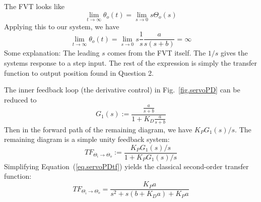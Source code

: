 \begin{Solution}{3}
        The FVT looks like
        \begin{equation}
            \lim_{t\to\infty} \theta_o(t) = \lim_{s\to0}s\Theta_o(s)
        \end{equation}
        Applying this to our system, we have
        \begin{equation}
            \lim_{t\to\infty} \theta_o(t)
            =
            \lim_{s\to0} s \frac{1}{s} \frac{a}{s(s+b)} = \infty
        \end{equation}
        Some explanation:  The leading $s$ comes from the FVT itself.  The $1/s$ gives the systems response to a step input.  The rest of the expression is simply the transfer function to output position found in Question 2.
        
\end{Solution}
\begin{Solution}{4}
        The inner feedback loop (the derivative control) in Fig.\ \ref{fig.servoPD} can be reduced to
        \begin{equation}
            G_1(s) := \frac{
                            \frac{a}{s+b}
                            }{
                            1+K_D\frac{a}{s+b}
                            }
        \end{equation}
        Then in the forward path of the remaining diagram, we have $K_P G_1(s)/s$.  The remaining diagram is a simple unity feedback system:
        \begin{equation}
            TF_{\Theta_i\to\Theta_o} :=
            \frac{K_P G_1(s)/s}{1+K_P G_1(s)/s}
                \label{eq.servoPDtf}
        \end{equation}
        Simplifying Equation~(\ref{eq.servoPDtf}) yields the classical second-order transfer function:
        \begin{equation}
            TF_{\Theta_i\to\Theta_o} =
            \frac{
                K_P a
                }{
                s^2 + s(b+K_D a) + K_P a
                }
                \label{eq.servoPD}
        \end{equation}
        
\end{Solution}
